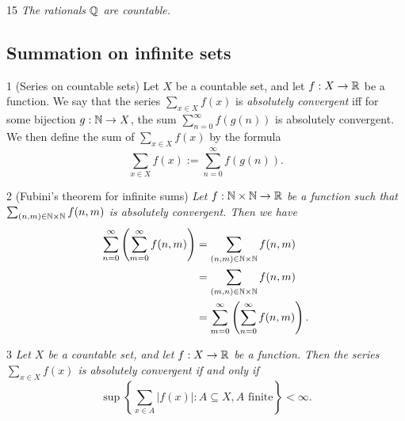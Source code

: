 \begin{corollary}{15}
    \label{rationals-countable}
    \emph{The rationals $\mathbb{Q}$ are countable.}
\end{corollary}

\subsection{Summation on infinite sets}
\begin{definition}{1}
    \label{countable-set-series}
    (Series on countable sets) Let $X$ be a countable set, and let $f: X \to \mathbb{R}$
    be a function. We say that the series $\sum_{x \in X} f(x)$ is \emph{absolutely
    convergent} iff for some bijection $g: \mathbb{N} \to X$, the sum $\sum_{n=0}^{\infty} f(g(n))$
    is absolutely convergent. We then define the sum of $\sum_{x \in X} f(x)$ by
    the formula
    \begin{equation*}
        \sum_{x \in X} f(x) := \sum_{n=0}^{\infty} f(g(n)).
    \end{equation*}
\end{definition}

\begin{theorem}{2}
    \label{fubini-infinite}
    (Fubini's theorem for infinite sums) \emph{Let $f: \mathbb{N} \times \mathbb{N} \to \mathbb{R}$
    be a function such that $\sum_{(n, m) \in \mathbb{N} \times \mathbb{N}} f(n, m)$ is
    absolutely convergent. Then we have
    \begin{align*}
        \sum_{n=0}^{\infty} \left( \sum_{m=0}^{\infty} f(n, m) \right)
        &= \sum_{(n, m) \in \mathbb{N} \times \mathbb{N}} f(n, m) \\
        &= \sum_{(m, n) \in \mathbb{N} \times \mathbb{N}} f(n, m) \\
        &= \sum_{m=0}^{\infty} \left( \sum_{n=0}^{\infty} f(n, m) \right).
    \end{align*}}
\end{theorem}

\begin{lemma}{3}
    \label{countable-sum-sup}
    \emph{Let $X$ be a countable set, and let $f: X \to \mathbb{R}$ be a function.
    Then the series $\sum_{x \in X} f(x)$ is absolutely convergent if and only if
    \begin{equation*}
        \sup \left\{ \sum_{x \in A} |f(x)| : A \subseteq X, A \text{ finite} \right\} < \infty.
    \end{equation*}}
\end{lemma}

